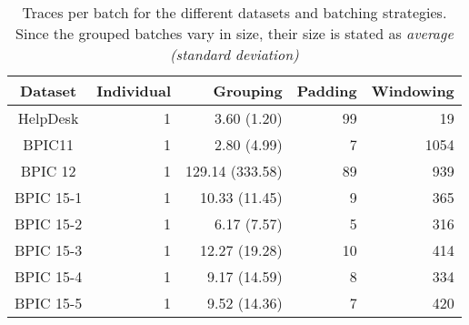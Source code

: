 \begin{table}[!htb]
\centering
\begin{tabular}{c|rrrr}
Dataset & Individual & Grouping & Padding & Windowing \\
\midrule
HelpDesk  & 1 & 3.60 (1.20) & 99 & 19\\
BPIC11    & 1 & 2.80 (4.99) & 7 & 1054\\
BPIC 12   & 1 & 129.14 (333.58) & 89 & 939\\
BPIC 15-1 & 1 & 10.33 (11.45) & 9 & 365\\
BPIC 15-2 & 1 & 6.17 (7.57) & 5 & 316\\
BPIC 15-3 & 1 & 12.27 (19.28) & 10 & 414\\
BPIC 15-4 & 1 & 9.17 (14.59) & 8 & 334\\
BPIC 15-5 & 1 & 9.52 (14.36) & 7 & 420\\
\end{tabular}
\caption[Batch sizes for each dataset and strategy]{Traces per batch for the different datasets and batching strategies. Since the grouped batches vary in size, their size is stated as \textit{average (standard deviation)}}
\label{tab:batch-sizes}
\end{table}
